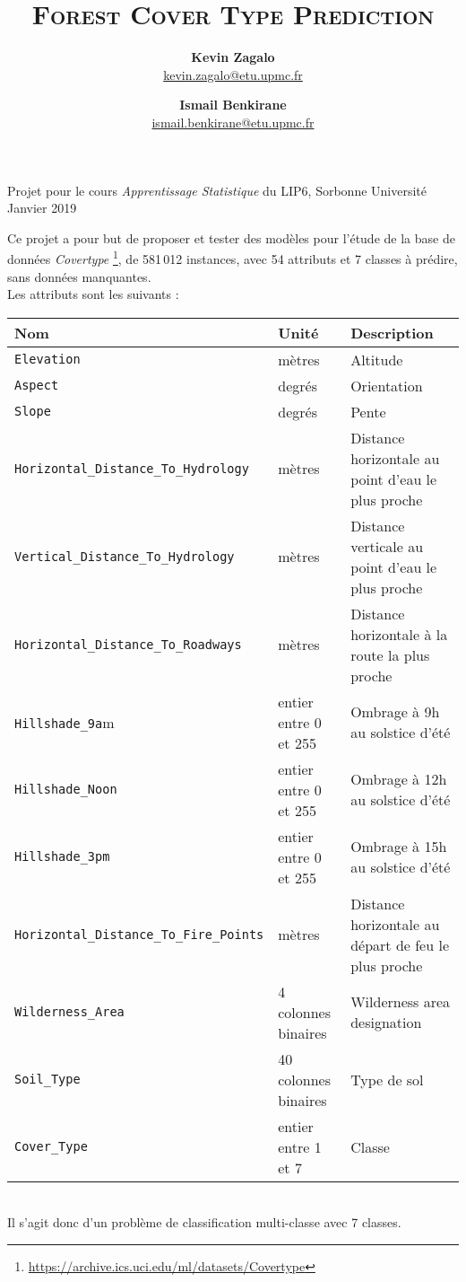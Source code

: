 \documentclass[12pt,a4paper]{article}
\title{\scshape \huge Forest Cover Type Prediction}
\author{\textbf{Kevin Zagalo} \\  \url{kevin.zagalo@etu.upmc.fr}  \and \textbf{Ismail Benkirane} \\ \url{ismail.benkirane@etu.upmc.fr}}
\date{}
\numberwithin{equation}{section}
\begin{document}
	\maketitle
	
{\small Projet pour le cours \textit{Apprentissage Statistique} du LIP6, Sorbonne Université} \hfill Janvier 2019
	
	\hrulefill

	{\small \justify Ce projet a pour but de proposer et tester des modèles pour l'étude de la base de données \textit{Covertype} \footnote{\url{https://archive.ics.uci.edu/ml/datasets/Covertype}}, de 581\,012 instances, avec 54 attributs et 7 classes à prédire, sans données manquantes.\\
	Les attributs sont les suivants : \\
	
		\begin{tabular}{l l p{5.2cm}}
			Nom & Unité & Description \\
			\hline
			\verb!Elevation! & mètres & Altitude \\ 
			\verb!Aspect! & degrés & Orientation \\ 
			\verb!Slope! & degrés & Pente \\
			\verb!Horizontal_Distance_To_Hydrology! & mètres & Distance horizontale au point d’eau le plus proche\\
			\verb!Vertical_Distance_To_Hydrology! & mètres & Distance verticale au point d’eau le plus proche \\
			\verb!Horizontal_Distance_To_Roadways! & mètres & Distance horizontale à la route la plus proche \\
			\verb!Hillshade_9a!m & entier entre 0 et 255 & Ombrage à 9h au solstice d’été \\
			\verb!Hillshade_Noon! & entier entre 0 et 255 & Ombrage à 12h au solstice d'été\\
			\verb!Hillshade_3pm! & entier entre 0 et 255 &  Ombrage à 15h au solstice d'été \\
			\verb!Horizontal_Distance_To_Fire_Points! & mètres & Distance horizontale au départ de feu le plus proche\\
			\verb!Wilderness_Area! & 4 colonnes binaires & Wilderness area designation \\
			\verb!Soil_Type! & 40 colonnes binaires & Type de sol\\
			\verb!Cover_Type! & entier entre 1 et 7 & Classe\\
		\end{tabular}\\
	
	\medskip
	Il s'agit donc d'un problème de classification multi-classe avec 7 classes.
	}
	\medskip
	
\end{document}
